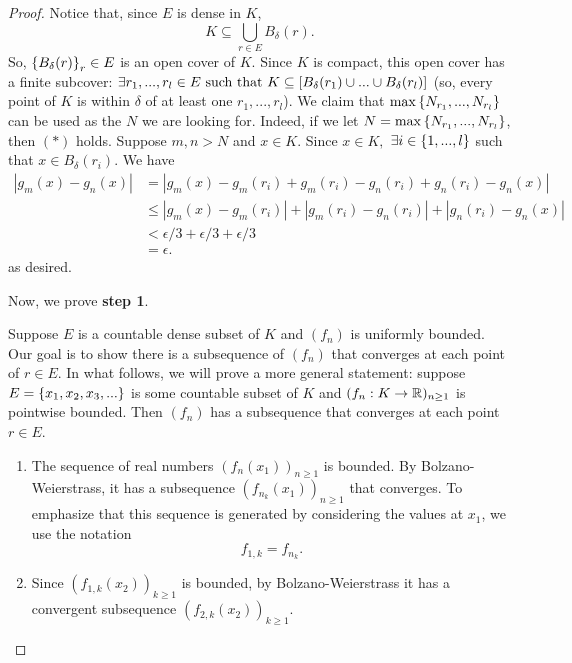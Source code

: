 \begin{proof}
    Notice that, since $E$ is dense in $K$,
    $$K\subseteq \bigcup_{r \in E}B_\delta(r).$$
    So, $\left\{B_\delta(r)\right\}_r \in E$ is an open cover of $K$. Since $K$ is compact, this open cover has a finite subcover: $\exists r_1,...,r_l \in E \text{ such that } K\subseteq \left[B_\delta(r_1)\cup...\cup B_\delta(r_l)\right]$ (so, every point of $K$ is within $\delta$ of at least one $r_1, ..., r_l$). We claim that $\max \left\{N_{r_1}, ..., N_{r_l}\right\}$ can be used as the $N$ we are looking for. Indeed, if we let $N =\max \left\{N_{r_1}, ..., N_{r_l}\right\}$, then $(*)$ holds. Suppose $m,n > N$ and $x \in K$. Since $x \in K,$ $\exists i \in \left\{1, ..., l\right\}$ such that $x \in B_\delta(r_i)$. We have
    \begin{align*}
        |g_m(x) - g_n(x)| &= |g_m(x)- g_m(r_i) + g_m(r_i) - g_n(r_i) + g_n(r_i) - g_n(x)| \\ 
        &\leq |g_m(x) - g_m(r_i)| + |g_m(r_i) - g_n(r_i)| + |g_n(r_i) - g_n(x)| \\
        &< \epsilon/3 + \epsilon / 3 + \epsilon / 3 \\
        &= \epsilon.
    \end{align*}
    as desired.


    Now, we prove \textbf{step 1}.

    Suppose $E$ is a countable dense subset of $K$ and $(f_n)$ is uniformly bounded. Our goal is to show there is a subsequence of $(f_n)$ that converges at each point of $r \in E$. In what follows, we will prove a more general statement: suppose $E = \left\{x_1, x_2, x_3, ...\right\}$ is some countable subset of $K$ and $(f_n: K \to \mathbb{R})_{n \geq 1}$ is pointwise bounded. Then $(f_n)$ has a subsequence that converges at each point $r \in E.$

    \begin{enumerate}[$*)$]
        \item The sequence of real numbers $(f_n(x_1))_{n\geq 1}$ is bounded. By Bolzano-Weierstrass, it has a subsequence $(f_{n_k}(x_1))_{n\geq 1}$ that converges. To emphasize that this sequence is generated by considering the values at $x_1$, we use the notation
        $$f_{1,k}=f_{n_k}.$$

        \item Since $(f_{1,k}(x_2))_{k \geq 1}$ is bounded, by Bolzano-Weierstrass it has a convergent subsequence $(f_{2,k}(x_2))_{k\geq 1}$.
        

\end{enumerate}
\end{proof}
